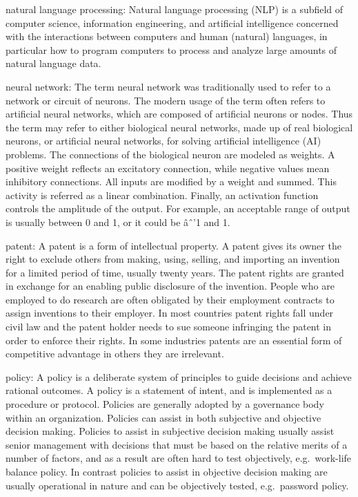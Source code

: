 \documentclass[]{book}
\begin{document}
natural language processing: Natural language processing (NLP) is a
subfield of computer science, information engineering, and artificial
intelligence concerned with the interactions between computers and human
(natural) languages, in particular how to program computers to process
and analyze large amounts of natural language data.

neural network: The term neural network was traditionally used to refer
to a network or circuit of neurons. The modern usage of the term often
refers to artificial neural networks, which are composed of artificial
neurons or nodes. Thus the term may refer to either biological neural
networks, made up of real biological neurons, or artificial neural
networks, for solving artificial intelligence (AI) problems. The
connections of the biological neuron are modeled as weights. A positive
weight reflects an excitatory connection, while negative values mean
inhibitory connections. All inputs are modified by a weight and summed.
This activity is referred as a linear combination. Finally, an
activation function controls the amplitude of the output. For example,
an acceptable range of output is usually between 0 and 1, or it could be
âˆ'1 and 1.

patent: A patent is a form of intellectual property. A patent gives its
owner the right to exclude others from making, using, selling, and
importing an invention for a limited period of time, usually twenty
years. The patent rights are granted in exchange for an enabling public
disclosure of the invention. People who are employed to do research are
often obligated by their employment contracts to assign inventions to
their employer. In most countries patent rights fall under civil law and
the patent holder needs to sue someone infringing the patent in order to
enforce their rights. In some industries patents are an essential form
of competitive advantage in others they are irrelevant.

policy: A policy is a deliberate system of principles to guide decisions
and achieve rational outcomes. A policy is a statement of intent, and is
implemented as a procedure or protocol. Policies are generally adopted
by a governance body within an organization. Policies can assist in both
subjective and objective decision making. Policies to assist in
subjective decision making usually assist senior management with
decisions that must be based on the relative merits of a number of
factors, and as a result are often hard to test objectively,
e.g.~work-life balance policy. In contrast policies to assist in
objective decision making are usually operational in nature and can be
objectively tested, e.g.~password policy.
\end{document}
